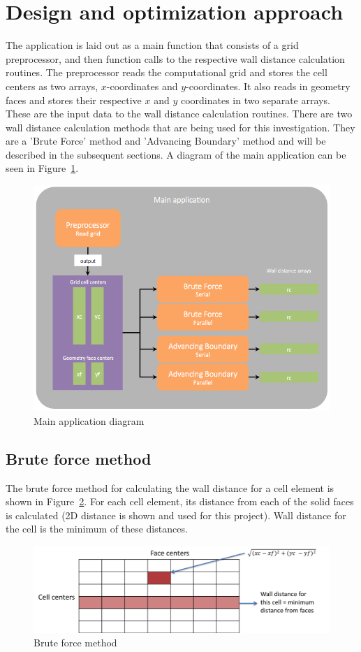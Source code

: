 \documentclass[]{aiaa-tc}%
\begin{document}
\section{Design and optimization approach}
The application is laid out as a main function that consists of a
grid preprocessor, and then function calls to the respective wall
distance calculation routines. The preprocessor reads the
computational grid and stores the cell centers as two arrays,
$x$-coordinates and $y$-coordinates. It also reads in geometry faces and
stores their respective $x$ and $y$ coordinates in two separate
arrays. These are the input data to the wall distance calculation
routines. There are two wall distance calculation methods that are
being used for this investigation. They are a 'Brute Force' method and
'Advancing Boundary' method and will be described in the subsequent
sections. A diagram of the main application can be seen in Figure~\ref{f:main_application}.

\begin{figure}
  \centering
  \includegraphics[width=0.6\linewidth]{figures/main_application_2}
  \caption{Main application diagram}
  \label{f:main_application}
\end{figure}


\subsection{Brute force method}

The brute force method for calculating the wall distance for a cell
element is shown in Figure~\ref{f:bf_1}.  For each cell element, its
distance from each of the solid faces is calculated (2D distance is
shown and used for this project).  Wall distance for the cell is the
minimum of these distances.

\begin{figure}
  \centering
  \includegraphics[width=0.7\linewidth]{figures/brute_force/bf_1}
  \caption{Brute force method}
  \label{f:bf_1}
\end{figure}
\end{document}
